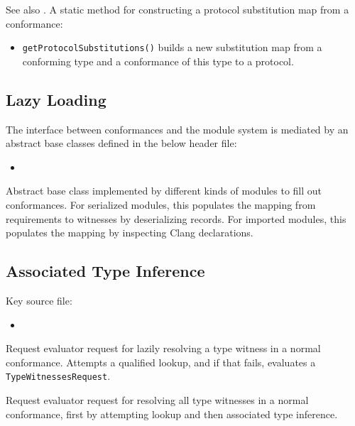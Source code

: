 \documentclass[../generics]{subfiles}
\begin{document}
See also . A static method for constructing a protocol substitution map from a conformance:
\begin{itemize}
\item \texttt{getProtocolSubstitutions()} builds a new substitution map from a conforming type and a conformance of this type to a protocol.
\end{itemize}

\subsection*{Lazy Loading}

The interface between conformances and the module system is mediated by an abstract base classes defined in the below header file:
\begin{itemize}
\item {}
\end{itemize}

Abstract base class implemented by different kinds of modules to fill out conformances. For serialized modules, this populates the mapping from requirements to witnesses by deserializing records. For imported modules, this populates the mapping by inspecting Clang declarations.

\subsection*{Associated Type Inference}

Key source file:
\begin{itemize}
\item {}
\end{itemize}

Request evaluator request for lazily resolving a type witness in a normal conformance. Attempts a qualified lookup, and if that fails, evaluates a \texttt{TypeWitnessesRequest}.

Request evaluator request for resolving all type witnesses in a normal conformance, first by attempting lookup and then associated type inference.
\end{document}
